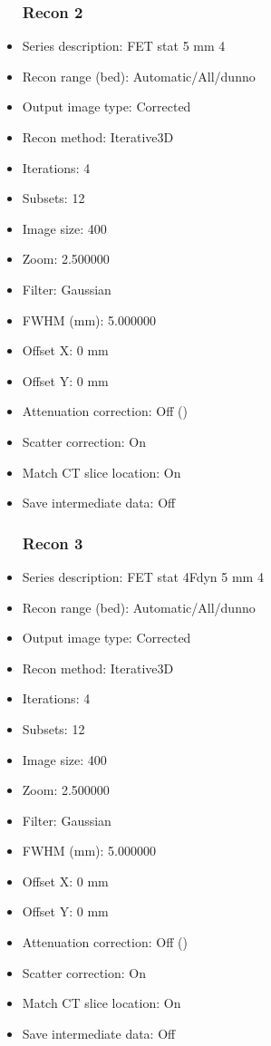 \documentclass[12pt]{article}
\begin{document}
\begin{itemize}
\subsubsection{Recon 2}
\item Series description: FET stat 5 mm 4
\item Recon range (bed): Automatic/All/dunno
\item Output image type: Corrected
\item Recon method: Iterative3D
\item Iterations: 4
\item Subsets: 12
\item Image size: 400
\item Zoom: 2.500000
\item Filter: Gaussian
\item FWHM (mm): 5.000000
\item Offset X: 0 mm
\item Offset Y: 0 mm
\item Attenuation correction: Off ()
\item Scatter correction: On
\item Match CT slice location: On
\item Save intermediate data: Off
\subsubsection{Recon 3}
\item Series description: FET stat 4Fdyn 5 mm 4
\item Recon range (bed): Automatic/All/dunno
\item Output image type: Corrected
\item Recon method: Iterative3D
\item Iterations: 4
\item Subsets: 12
\item Image size: 400
\item Zoom: 2.500000
\item Filter: Gaussian
\item FWHM (mm): 5.000000
\item Offset X: 0 mm
\item Offset Y: 0 mm
\item Attenuation correction: Off ()
\item Scatter correction: On
\item Match CT slice location: On
\item Save intermediate data: Off

\end{itemize}
\end{document}
